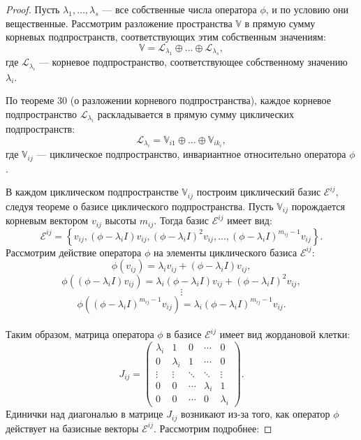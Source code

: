 \begin{proof}
    \leavevmode \nl 
    
    Пусть \( \lambda_{1}, \ldots, \lambda_{s} \) — все собственные числа оператора \( \phi \), и по условию они \\вещественные. Рассмотрим разложение пространства \( \mathbb{V} \) в прямую сумму корневых подпространств, соответствующих этим собственным значениям:
    \[
    \mathbb{V} = \mathcal{L}_{\lambda_{1}} \oplus \ldots \oplus \mathcal{L}_{\lambda_{s}},
    \]
    где \( \mathcal{L}_{\lambda_{i}} \) — корневое подпространство, соответствующее собственному значению \( \lambda_{i} \).

    По теореме 30 (о разложении корневого подпространства), каждое корневое \\подпространство \( \mathcal{L}_{\lambda_{i}} \) раскладывается в прямую сумму циклических подпространств:
    \[
    \mathcal{L}_{\lambda_{i}} = \mathbb{V}_{i1} \oplus \ldots \oplus \mathbb{V}_{ik_{i}},
    \]
    где \( \mathbb{V}_{ij} \) — циклическое подпространство, инвариантное относительно оператора \( \phi \).

    В каждом циклическом подпространстве \( \mathbb{V}_{ij} \) построим циклический базис \( \mathcal{E}^{ij} \), \\следуя теореме о базисе циклического подпространства. Пусть \( \mathbb{V}_{ij} \) порождается \\корневым вектором \( v_{ij} \) высоты \( m_{ij} \). Тогда базис \( \mathcal{E}^{ij} \) имеет вид:
    \[
    \mathcal{E}^{ij} = \left\{ v_{ij}, (\phi - \lambda_{i} I) v_{ij}, (\phi - \lambda_{i} I)^2 v_{ij}, \ldots, (\phi - \lambda_{i} I)^{m_{ij}-1} v_{ij} \right\}.
    \]
    Рассмотрим действие оператора \( \phi \) на элементы циклического базиса \( \mathcal{E}^{ij}:\)
    \[
    \phi(v_{ij}) = \lambda_{i} v_{ij} + (\phi - \lambda_{i} I) v_{ij},
    \]
    \[
    \phi\left((\phi - \lambda_{i} I) v_{ij}\right) = \lambda_{i} (\phi - \lambda_{i} I) v_{ij} + (\phi - \lambda_{i} I)^2 v_{ij},
    \]
    \[
    \vdots
    \]
    \[
    \phi\left((\phi - \lambda_{i} I)^{m_{ij}-1} v_{ij}\right) = \lambda_{i} (\phi - \lambda_{i} I)^{m_{ij}-1} v_{ij}.
    \]
    \\
    Таким образом, матрица оператора \( \phi \) в базисе \( \mathcal{E}^{ij} \) имеет вид жордановой клетки:
\[
J_{ij} = \begin{pmatrix}
    \lambda_{i} & 1 & 0 & \cdots & 0 \\
    0 & \lambda_{i} & 1 & \cdots & 0 \\
    \vdots & \vdots & \ddots & \ddots & \vdots \\
    0 & 0 & \cdots & \lambda_{i} & 1 \\
    0 & 0 & \cdots & 0 & \lambda_{i}
\end{pmatrix}.
\]
    Единички над диагональю в матрице \( J_{ij} \) возникают из-за того, как оператор \( \phi \) действует на базисные векторы \( \mathcal{E}^{ij} \). Рассмотрим подробнее:
    

\end{proof}
